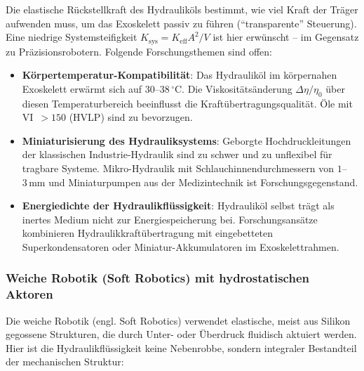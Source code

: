 ﻿\documentclass[a4paper,12pt]{scrreprt}
\theoremstyle{definition}
\begin{document}
Die elastische Rückstellkraft des Hydrauliköls bestimmt, wie viel
Kraft der Träger aufwenden muss, um das Exoskelett passiv zu führen
(``transparente'' Steuerung). Eine niedrige Systemsteifigkeit
$K_{\mathrm{sys}} = K_{\mathrm{eff}} A^2 / V$ ist hier erwünscht --
im Gegensatz zu Präzisionsrobotern. Folgende Forschungsthemen sind
offen:
\begin{itemize}
  \item \textbf{Körpertemperatur-Kompatibilität}: Das Hydrauliköl im
    körpernahen Exoskelett erwärmt sich auf $30$--$38\,{^\circ}\mathrm{C}$.
    Die Viskositätsänderung $\Delta\eta / \eta_0$ über diesen
    Temperaturbereich beeinflusst die Kraftübertragungsqualität.
    Öle mit VI~$> 150$ (HVLP) sind zu bevorzugen.
  \item \textbf{Miniaturisierung des Hydrauliksystems}: Geborgte
    Hochdruckleitungen der klassischen Industrie-Hydraulik sind
    zu schwer und zu unflexibel für tragbare Systeme. Mikro-Hydraulik
    mit Schlauchinnendurchmessern von $1$--$3\,\mathrm{mm}$ und
    Miniaturpumpen aus der Medizintechnik ist Forschungsgegenstand.
  \item \textbf{Energiedichte der Hydraulikflüssigkeit}: Hydrauliköl selbst
    trägt als inertes Medium nicht zur Energiespeicherung bei.
    Forschungsansätze kombinieren Hydraulikkraftübertragung
    mit eingebetteten Superkondensatoren oder Miniatur-Akkumulatoren
    im Exoskelettrahmen.
\end{itemize}

\subsubsection{Weiche Robotik (Soft Robotics) mit hydrostatischen Aktoren}

Die weiche Robotik (engl. Soft Robotics) verwendet elastische, meist
aus Silikon gegossene Strukturen, die durch Unter- oder Überdruck
fluidisch aktuiert werden. Hier ist die Hydraulikflüssigkeit keine
Neben\-robbe, sondern integraler Bestandteil der mechanischen Struktur:
\end{document}
